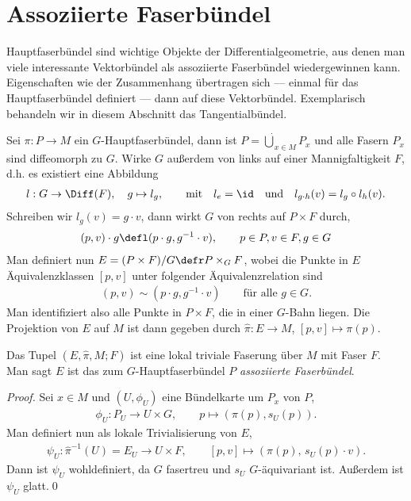 \documentclass[%
	paper=a5,%
	fleqn,%
	DIV=18,%
	BCOR=0mm,
	fontsize=11pt,
	titlepage=false,%
	bibliography=totoc,
	DIV=18,%
	twoside=true,
	pdftitle=Riemannsche Geometrie,
	pdfauthor=Uwe Semmelmann,
	numbers=noendperiod]%
	{scrbook}
\begin{document}
\section{Assoziierte Faserbündel}

Hauptfaserbündel sind wichtige Objekte der Differentialgeometrie, aus denen man viele interessante
Vektorbündel als assoziierte Faserbündel wiedergewinnen kann. Eigenschaften wie
der Zusammenhang übertragen sich --- einmal für das Hauptfaserbündel definiert
--- dann auf diese Vektorbündel. Exemplarisch behandeln wir in diesem Abschnitt
das Tangentialbündel.

Sei $\pi: P\to M$ ein $G$-Hauptfaserbündel, dann ist $P = \dot{\bigcup}_{x\in
M} P_x$ und alle Fasern $P_x$ sind diffeomorph zu $G$.
Wirke $G$ außerdem von links auf einer Mannigfaltigkeit $F$, d.h. es existiert
eine Abbildung
\begin{align*}
l : G\to \Diff(F),\quad g\mapsto l_g,\qquad
\text{mit}\quad l_e=\id \quad\text{und}\quad l_{g\cdot h}(v) = l_g\circ l_h(v).
\end{align*}
Schreiben wir $l_g(v) = g\cdot v$, dann wirkt $G$ von rechts auf $P\times F$
durch,
\begin{align*}
(p,v)\cdot g \defl (p\cdot g, g^{-1}\cdot v),\qquad p\in P,v\in F, g\in G
\end{align*}
Man definiert nun $E=(P\times F)/G \defr P\times_G F$, wobei die Punkte in $E$
Äquivalenzklassen $[p,v]$ unter folgender Äquivalenzrelation sind
\begin{align*}
(p,v)\sim (p\cdot g,g^{-1}\cdot v)\qquad \text{für alle }g\in G.
\end{align*}
Man identifiziert also alle Punkte in $P\times F$, die in einer $G$-Bahn liegen.
Die Projektion von $E$ auf $M$ ist dann gegeben durch $\hat{\pi}: E\to M$,
$[p,v] \mapsto \pi(p)$.

\begin{prop}
Das Tupel $(E,\hat{\pi},M;F)$ ist eine lokal triviale Faserung über $M$ mit
Faser $F$. Man sagt $E$ ist das zum $G$-Hauptfaserbündel $P$ \emph{assoziierte
Faserbündel}.\fish
\end{prop}

\begin{proof}
Sei $x\in M$ und $(U,\phi_U)$ eine Bündelkarte um $P_x$ von $P$,
\begin{align*}
\phi_U : P_U \to U\times G,\qquad p \mapsto (\pi(p),s_U(p)). 
\end{align*}
Man definiert nun als lokale Trivialisierung von $E$,
\begin{align*}
\psi_U : \hat{\pi}^{-1}(U) = E_U \to U\times F,
\qquad [p,v] \mapsto (\pi(p),\,s_U(p)\cdot v).
\end{align*}
Dann ist $\psi_U$ wohldefiniert, da $G$ fasertreu und  $s_U$ $G$-äquivariant ist. Außerdem ist $\psi_U$ glatt.\qed
\end{proof}
\end{document}
